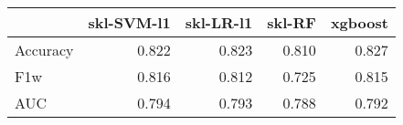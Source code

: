 \begin{tabular}{lrrrr}
\toprule
{} &  skl-SVM-l1 &  skl-LR-l1 &  skl-RF &  xgboost \\
\midrule
Accuracy &       0.822 &      0.823 &   0.810 &    0.827 \\
F1w      &       0.816 &      0.812 &   0.725 &    0.815 \\
AUC      &       0.794 &      0.793 &   0.788 &    0.792 \\
\bottomrule
\end{tabular}
